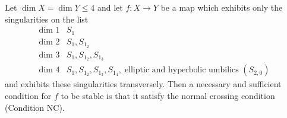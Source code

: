 Let $\dim X = \dim Y \leq 4$ and let $f: X \to Y$ be a map which exhibits only the singularities on the list
$$
\begin{array}{ll}
\text{dim 1} & S_1 \\
\text{dim 2} & S_1, S_{1_2} \\
\text{dim 3} & S_1, S_{1_2}, S_{1_3} \\
\text{dim 4} & S_1, S_{1_2}, S_{1_3}, S_{1_4},\; \text{elliptic and hyperbolic umbilics } (S_{2,0})
\end{array}
$$
and exhibits these singularities transversely. Then a necessary and sufficient condition for $f$ to be stable is that it satisfy the normal crossing condition (Condition NC).
